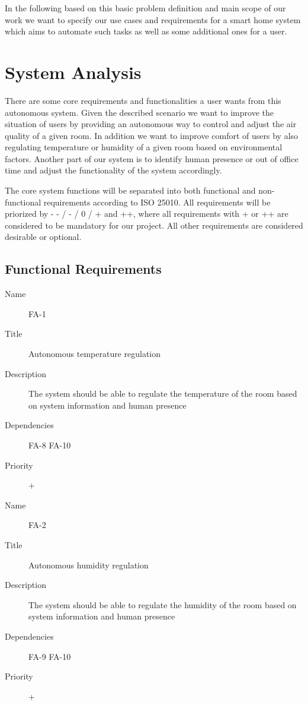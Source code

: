 \documentclass[runningheads]{llncs}
\begin{document}
    In the following based on this basic problem definition and main scope of our work we want to specify our use cases and requirements for a smart home system which aims to automate such tasks as well as some additional ones for a user.


    \section{System Analysis}
    There are some core requirements and functionalities a user wants from this autonomous system.
    Given the described scenario we want to improve the situation of users by providing an autonomous way to control and adjust the air quality of a given room.
    In addition we want to improve comfort of users by also regulating temperature or humidity of a given room based on environmental factors.
    Another part of our system is to identify human presence or out of office time and adjust the functionality of the system accordingly.

    The core system functions will be separated into both functional and non-functional requirements according to ISO 25010.
    All requirements will be priorized by - - / - / 0 / + and ++, where all requirements with + or ++ are considered to be mandatory for our project.
    All other requirements are considered desirable or optional.

    \subsection{Functional Requirements}

    \begin{description}
        \item[Name] FA-1
        \item[Title] Autonomous temperature regulation
        \item[Description] The system should be able to regulate the temperature of the room based on system information and human presence
        \item[Dependencies] FA-8 FA-10
        \item[Priority] +
    \end{description}

    \begin{description}
        \item[Name] FA-2
        \item[Title] Autonomous humidity regulation
        \item[Description] The system should be able to regulate the humidity of the room based on system information and human presence
        \item[Dependencies] FA-9 FA-10
        \item[Priority] +
    \end{description}
\end{document}
